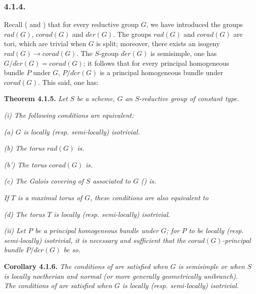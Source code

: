 \subsubsection*{4.1.4.}

Recall ( and ) that for every reductive group \(G\), we have introduced the groups \(rad(G)\), \(corad(G)\)
and \(d\acute{e}r(G)\). The groups \(rad(G)\) and \(corad(G)\) are tori, which are trivial when \(G\) is split; moreover, there
exists an isogeny \(rad(G) \to corad(G)\). The \(S\)-group \(d\acute{e}r(G)\) is semisimple, one has \(G / d\acute{e}r(G) =
corad(G)\); it follows that for every principal homogeneous bundle \(P\) under \(G\), \(P / d\acute{e}r(G)\) is a principal
homogeneous bundle under \(corad(G)\). This said, one has:

\textbf{Theorem 4.1.5.} \emph{Let \(S\) be a scheme, \(G\) an \(S\)-reductive group of constant type.}

\emph{(i) The following conditions are equivalent:}

\emph{(a) \(G\) is locally (resp. semi-locally) isotrivial.}

\emph{(b) The torus \(rad(G)\) is.}

\emph{(b') The torus \(corad(G)\) is.}

\emph{(c) The Galois covering of \(S\) associated to \(G\) () is.}

\emph{If \(T\) is a maximal torus of \(G\), these conditions are also equivalent to}

\emph{(d) The torus \(T\) is locally (resp. semi-locally) isotrivial.}

\emph{(ii) Let \(P\) be a principal homogeneous bundle under \(G\); for \(P\) to be locally (resp. semi-locally) isotrivial, it is
necessary and sufficient that the \(corad(G)\)-principal bundle \(P / d\acute{e}r(G)\) be so.}

\textbf{Corollary 4.1.6.} \emph{The conditions of  are satisfied when \(G\) is semisimple or when \(S\) is locally noetherian and
normal (or more generally geometrically unibranch). The conditions of  are satisfied when \(G\) is locally (resp.
semi-locally) isotrivial.}

